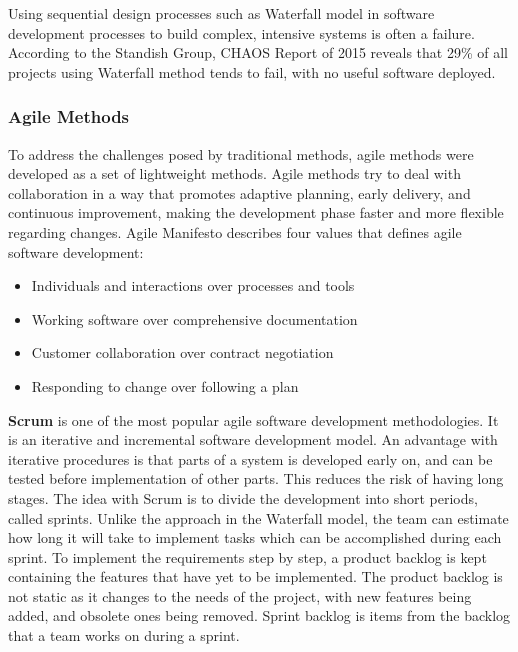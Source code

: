 Using sequential design processes such as Waterfall model in software development processes to build complex, intensive systems is often a failure\cite{p50-allman}. According to the Standish Group, CHAOS Report of 2015 reveals that 29\% of all projects using Waterfall method tends to fail, with no useful software deployed. 


\subsubsection{Agile Methods}
To address the challenges posed by traditional methods, agile methods were developed as a set of lightweight methods\cite{hijazi2012review}. Agile methods try to deal with collaboration in a way that promotes adaptive planning, early delivery, and continuous improvement, making the development phase faster and more flexible regarding changes\cite{abrahamsson2002agile}. Agile Manifesto describes four values that defines agile software development\cite{agilemanifesto}: 
\begin{itemize}
	\item Individuals and interactions over processes and tools
	\item Working software over comprehensive documentation
	\item Customer collaboration over contract negotiation
	\item Responding to change over following a plan
\end{itemize}

\textbf{Scrum} is one of the most popular agile software development methodologies. It is an iterative and incremental software development model. An advantage with iterative procedures is that parts of a system is developed early on, and can be tested before implementation of other parts. This reduces the risk of having long stages. The idea with Scrum is to divide the development into short periods, called sprints. Unlike the approach in the Waterfall model, the team can estimate how long it will take to implement tasks which can be accomplished during each sprint. To implement the requirements step by step, a product backlog is kept containing the features that have yet to be implemented. The product backlog is not static as it changes to the needs of the project, with new features being added, and obsolete ones being removed. Sprint backlog is items from the backlog that a team works on during a sprint.


